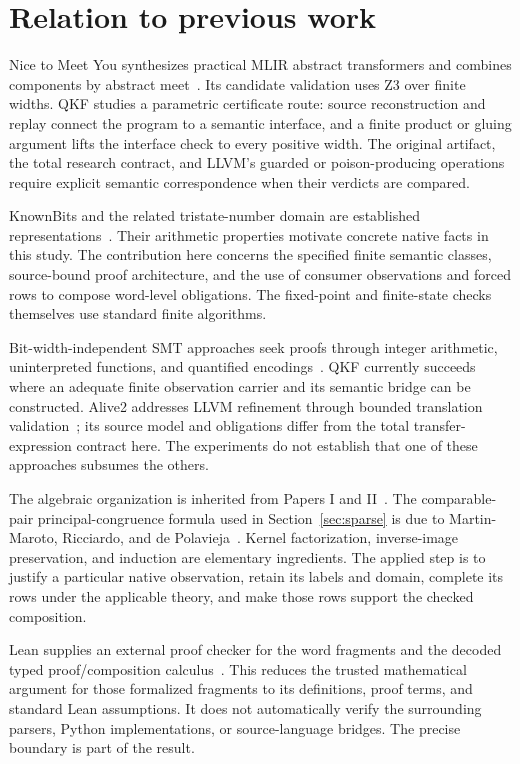 \section{Relation to previous work}

Nice to Meet You synthesizes practical MLIR abstract transformers and combines components by abstract meet~\cite{Peng2026,NTMYArtifact}. Its candidate validation uses Z3 over finite widths. QKF studies a parametric certificate route: source reconstruction and replay connect the program to a semantic interface, and a finite product or gluing argument lifts the interface check to every positive width. The original artifact, the total research contract, and LLVM's guarded or poison-producing operations require explicit semantic correspondence when their verdicts are compared.

KnownBits and the related tristate-number domain are established representations~\cite{LLVMKnownBits,Vishwanathan2022}. Their arithmetic properties motivate concrete native facts in this study. The contribution here concerns the specified finite semantic classes, source-bound proof architecture, and the use of consumer observations and forced rows to compose word-level obligations. The fixed-point and finite-state checks themselves use standard finite algorithms.

Bit-width-independent SMT approaches seek proofs through integer arithmetic, uninterpreted functions, and quantified encodings~\cite{Niemetz2019}. QKF currently succeeds where an adequate finite observation carrier and its semantic bridge can be constructed. Alive2 addresses LLVM refinement through bounded translation validation~\cite{Lopes2021}; its source model and obligations differ from the total transfer-expression contract here. The experiments do not establish that one of these approaches subsumes the others.

The algebraic organization is inherited from Papers I and II~\cite{ShcherbakovI,ShcherbakovII}. The comparable-pair principal-congruence formula used in Section~\ref{sec:sparse} is due to Martin-Maroto, Ricciardo, and de Polavieja~\cite{MartinMaroto2026}. Kernel factorization, inverse-image preservation, and induction are elementary ingredients. The applied step is to justify a particular native observation, retain its labels and domain, complete its rows under the applicable theory, and make those rows support the checked composition.

Lean supplies an external proof checker for the word fragments and the decoded typed proof/composition calculus~\cite{Lean4,LeanReference}. This reduces the trusted mathematical argument for those formalized fragments to its definitions, proof terms, and standard Lean assumptions. It does not automatically verify the surrounding parsers, Python implementations, or source-language bridges. The precise boundary is part of the result.
